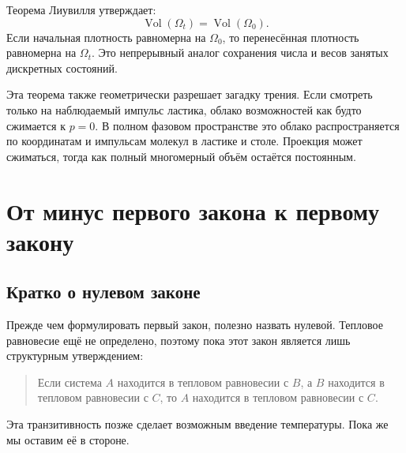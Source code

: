 Теорема Лиувилля утверждает:
\begin{equation}
 \operatorname{Vol}(\Omega_t)
 =
 \operatorname{Vol}(\Omega_0).
 \label{eq:sm1-liouville-volume}
\end{equation}
Если начальная плотность равномерна на \(\Omega_0\), то перенесённая плотность равномерна на \(\Omega_t\). Это непрерывный аналог сохранения числа и весов занятых дискретных состояний.

Эта теорема также геометрически разрешает загадку трения. Если смотреть только на наблюдаемый импульс ластика, облако возможностей как будто сжимается к \(p=0\). В полном фазовом пространстве это облако распространяется по координатам и импульсам молекул в ластике и столе. Проекция может сжиматься, тогда как полный многомерный объём остаётся постоянным.

\begin{classroomqa}
\end{classroomqa}

\section{От минус первого закона к первому закону}

\subsection{Кратко о нулевом законе}

Прежде чем формулировать первый закон, полезно назвать нулевой. Тепловое равновесие ещё не определено, поэтому пока этот закон является лишь структурным утверждением:
\begin{quote}
Если система \(A\) находится в тепловом равновесии с \(B\), а \(B\) находится в тепловом равновесии с \(C\), то \(A\) находится в тепловом равновесии с \(C\).
\end{quote}
Эта транзитивность позже сделает возможным введение температуры. Пока же мы оставим её в стороне.

